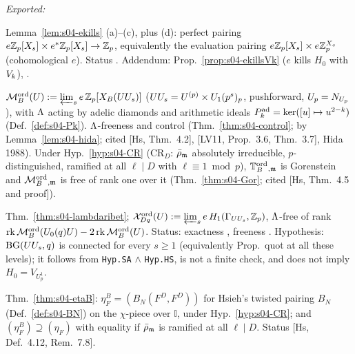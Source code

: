 \emph{Exported:}
\begin{interface}\label{if:s04-ekills}
Lemma~\ref{lem:s04-ekills} (a)--(c), plus (d): perfect pairing $e\mathbb{Z}_p[X_s]\times e^*\mathbb{Z}_p[X_s]\to\mathbb{Z}_p$, equivalently the evaluation pairing
$e\mathbb{Z}_p[X_s]\times e\mathbb{Z}_p^{X_s}$ (cohomological $e$). Status \stproved. Addendum: Prop.~\ref{prop:s04-ekillsVk} ($e$ kills $H_0$ with $V_k$), \sttoprove.
\end{interface}
\begin{interface}\label{if:s04-Mord}
$\mathcal{M}^{\mathrm{ord}}_B(U):=\varprojlim_se\,\mathbb{Z}_p[X_B(UU_s)]$ ($UU_s=U^{(p)}\times U_1(p^s)_p$, pushforward, $U_p=N_{U_p}$), with $\Lambda$ acting by adelic
diamonds and arithmetic ideals $P^{\rm ad}_k=\ker([u]\mapsto u^{2-k})$ (Def.~\ref{def:s04-Pk}). $\Lambda$-freeness and control
(Thm.~\ref{thm:s04-control}; \stpmc{} by Lemma~\ref{lem:s04-hida}; cited [Hs, Thm.~4.2], [LV11, Prop.~3.6, Thm.~3.7], Hida 1988).
Under Hyp.~\ref{hyp:s04-CR} (CR$_D$: $\bar\rho_{\mathfrak{m}}$ absolutely irreducible, $p$-distinguished, ramified at all $\ell\mid D$ with
$\ell\equiv1\bmod p$), $\mathbb{T}^{\mathrm{ord}}_B{}_{,\mathfrak{m}}$ is Gorenstein and $\mathcal{M}^{\mathrm{ord}}_B{}_{,\mathfrak{m}}$ is free of rank one over it (Thm.~\ref{thm:s04-Gor}; cited [Hs, Thm.~4.5 and proof]).
\end{interface}
\begin{interface}\label{if:s04-lambdaribet}
Thm.~\ref{thm:s04-lambdaribet}; $\mathcal{X}^{\mathrm{ord}}_{Dq}(U):=\varprojlim_se\,H_1(\Gamma_{UU_s},\mathbb{Z}_p)$, $\Lambda$-free of rank
$\operatorname{rk}\mathcal{M}^{\mathrm{ord}}_B(U_0(q)U)-2\operatorname{rk}\mathcal{M}^{\mathrm{ord}}_B(U)$. Status: exactness \stproved, freeness \stpmc. Hypothesis: $\mathrm{BG}(UU_s,q)$ is connected for every $s\ge1$ (equivalently Prop.~quot at all these levels); it follows from \texttt{Hyp.SA} $\wedge$ \texttt{Hyp.HS}, is not a finite check, and does not imply $H_0=V_{U_p^1}$.
\end{interface}
\begin{interface}\label{if:s04-etaB}
Thm.~\ref{thm:s04-etaB}: $\eta^B_F=(B_N(F^D,F^D))$ for Hsieh's twisted pairing $B_N$ (Def.~\ref{def:s04-BN}) on the $\chi$-piece over
$\mathbb I$, under Hyp.~\ref{hyp:s04-CR}; and $(\eta^B_F)\supseteq(\eta_F)$ with equality if $\bar\rho_{\mathfrak{m}}$ is ramified at all $\ell\mid D$.
Status \stcited{} [Hs, Def.~4.12, Rem.~7.8].
\end{interface}


